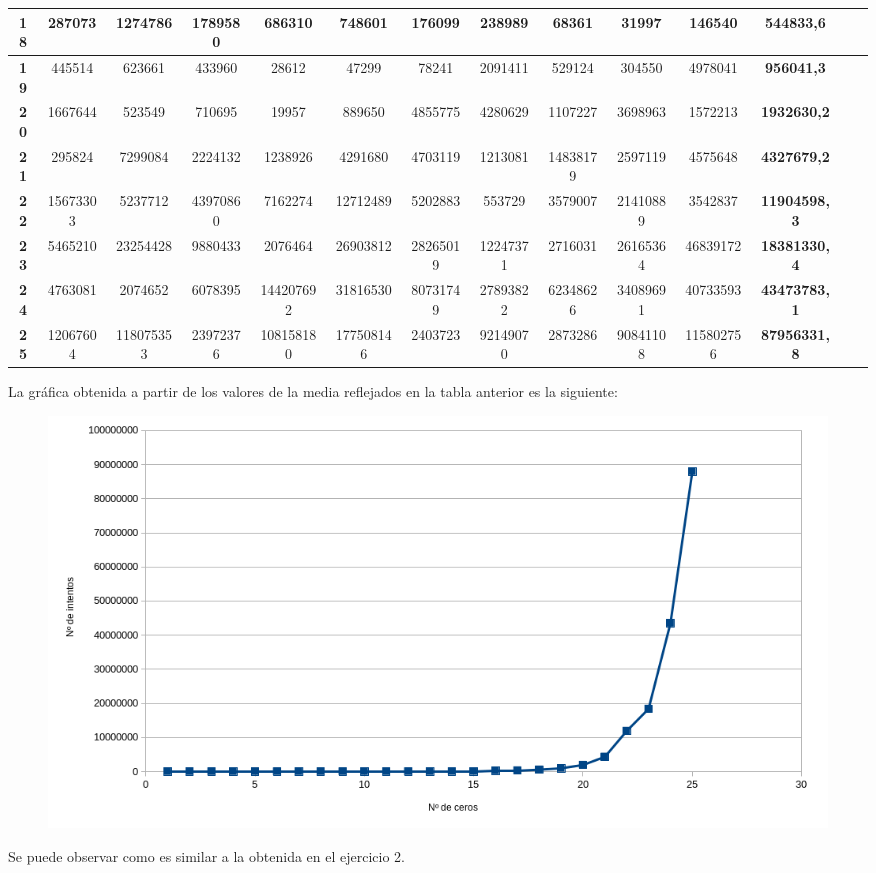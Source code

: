 \documentclass[10pt,a4paper,spanish]{report}
\begin{document}
\begin{table}[h!]
\begin{adjustbox}{max width=\textwidth}
\begin{tabular}{*{14}{|c}|}
   \textbf{18}                      & 287073     & 1274786    & 1789580    & 686310     & 748601     & 176099     & 238989     & 68361      & 31997      & 146540      & \textbf{544833,6}   \\ \hline
   \textbf{19}                      & 445514     & 623661     & 433960     & 28612      & 47299      & 78241      & 2091411    & 529124     & 304550     & 4978041     & \textbf{956041,3}   \\ \hline
   \textbf{20}                      & 1667644    & 523549     & 710695     & 19957      & 889650     & 4855775    & 4280629    & 1107227    & 3698963    & 1572213     & \textbf{1932630,2}  \\ \hline
   \textbf{21}                      & 295824     & 7299084    & 2224132    & 1238926    & 4291680    & 4703119    & 1213081    & 14838179   & 2597119    & 4575648     & \textbf{4327679,2}  \\ \hline
   \textbf{22}                      & 15673303   & 5237712    & 43970860   & 7162274    & 12712489   & 5202883    & 553729     & 3579007    & 21410889   & 3542837     & \textbf{11904598,3} \\ \hline
   \textbf{23}                      & 5465210    & 23254428   & 9880433    & 2076464    & 26903812   & 28265019   & 12247371   & 2716031    & 26165364   & 46839172    & \textbf{18381330,4} \\ \hline
   \textbf{24}                      & 4763081    & 2074652    & 6078395    & 144207692  & 31816530   & 80731749   & 27893822   & 62348626   & 34089691   & 40733593    & \textbf{43473783,1} \\ \hline
   \textbf{25}                      & 12067604   & 118075353  & 23972376   & 108158180  & 177508146  & 2403723    & 92149070   & 2873286    & 90841108   & 115802756   & \textbf{87956331,8} \\ \hline
  \end{tabular}
 \end{adjustbox}
\end{table}

\noindent
La gráfica obtenida a partir de los valores de la media reflejados en la tabla anterior es la siguiente:

\begin{figure}[!hbp]
 \centering  \includegraphics[width=1\textwidth]{./Imagenes/grafica_2.png}
\end{figure}

\noindent
Se puede observar como es similar a la obtenida en el ejercicio 2.

\end{document}
